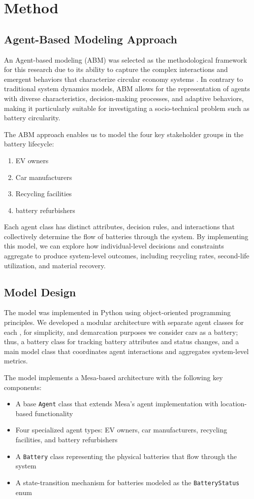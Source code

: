 \section{Method}
\subsection{Agent-Based Modeling Approach}
An Agent-based modeling (ABM) was selected as the methodological framework for this research due to its ability to capture the complex interactions and emergent behaviors that characterize circular economy systems \cite{Hansen2020}. In contrary to traditional system dynamics models, ABM allows for the representation of agents with diverse characteristics, decision-making processes, and adaptive behaviors, making it particularly suitable for investigating a socio-technical problem such as battery circularity.

The ABM approach enables us to model the four key stakeholder groups in the battery lifecycle:
\begin{enumerate}
    \item EV owners
    \item Car manufacturers
    \item Recycling facilities
    \item battery refurbishers
\end{enumerate}
Each agent class has distinct attributes, decision rules, and interactions that collectively determine the flow of batteries through the system. By implementing this model, we can explore how individual-level decisions and constraints aggregate to produce system-level outcomes, including recycling rates, second-life utilization, and material recovery.

\subsection{Model Design}
The model was implemented in Python using object-oriented programming principles. We developed a modular architecture with separate agent classes for each , for simplicity, and demarcation purposes we consider cars as a battery; thus, a battery class for tracking battery attributes and status changes, and a main model class that coordinates agent interactions and aggregates system-level metrics.

The model implements a Mesa-based architecture with the following key components:
\begin{itemize}
    \item A base \texttt{Agent} class that extends Mesa's agent implementation with location-based functionality
    \item Four specialized agent types: EV owners, car manufacturers, recycling facilities, and battery refurbishers
    \item A \texttt{Battery} class representing the physical batteries that flow through the system
    \item A state-transition mechanism for batteries modeled as the \texttt{BatteryStatus} enum
\end{itemize}

